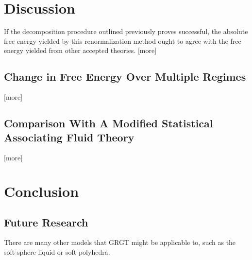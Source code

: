 \documentclass[12pt]{article}
\begin{document}
\section{Discussion}
If the decomposition procedure outlined previously proves successful, the absolute free energy yielded by this renormalization method ought to agree with the free energy yielded from other accepted theories. [more]
\subsection{Change in Free Energy Over Multiple Regimes}
[more]
\subsection{Comparison With A Modified Statistical Associating Fluid Theory}
[more]



\section{Conclusion}


\subsection{Future Research}
There are many other models that GRGT might be applicable to, such as the soft-sphere liquid or soft polyhedra.
%

\end{document}
